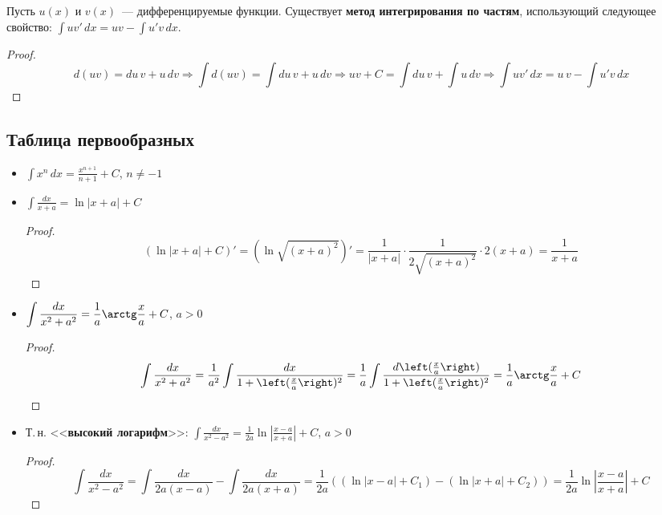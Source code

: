 Пусть $u(x)$ и $v(x)$~--- дифференцируемые функции.
 Существует \textbf{метод интегрирования по частям}, использующий следующее свойство:
$\int uv'\,dx = uv - \int u'v\,dx$.
\begin{proof}
\begin{equation*}
d(uv) = du\,v + u\,dv \Rightarrow
\int d(uv) = \int du\,v + u\,dv \Rightarrow
uv + C = \int du\,v + \int u\,dv \Rightarrow
\int uv'\,dx = u\,v - \int u'v\,dx
\end{equation*}
\end{proof}

\subsection{Таблица первообразных}
\begin{itemize}
	\item $\displaystyle \int x^n\,dx = \frac{x^{n+1}}{n + 1} + C$, $n \neq -1$
	
	\item $\displaystyle \int \frac{dx}{x + a} = \ln |x + a| + C$
	\begin{proof}
	\begin{equation*}
	(\ln |x + a| + C)' = (\ln \sqrt{(x + a)^2})' = \frac1{|x + a|} \cdot \frac1{2\sqrt{(x + a)^2}} \cdot 2(x + a) = \frac1{x + a}
	\end{equation*}
	\end{proof}
	
	\item $\displaystyle \int \frac{dx}{x^2 + a^2} = \frac1a \arctg \frac{x}a + C$, $a > 0$
	\begin{proof}
	\begin{equation*}
	\int \frac{dx}{x^2 + a^2} =
	\frac1{a^2} \int \frac{dx}{1 + \left( \frac{x}a \right)^2} =
	\frac1a \int \frac{d \left( \frac{x}a \right)}{1 + \left( \frac{x}a \right)^2} =
	\frac1a \arctg \frac{x}a + C
	\end{equation*}
	\end{proof}
	
	\item Т.\,н. <<\textbf{высокий логарифм}>>: $\displaystyle \int \frac{dx}{x^2 - a^2} = \frac1{2a} \ln \left| \frac{x - a}{x + a} \right| + C$, $a > 0$
	\begin{proof}
	\begin{equation*}
	\int \frac{dx}{x^2 - a^2} =
	\int \frac{dx}{2a(x - a)} - \int \frac{dx}{2a(x + a)} =
	\frac1{2a} ((\ln |x - a| + C_1) - (\ln |x + a| + C_2)) =
	\frac1{2a} \ln \left| \frac{x - a}{x + a} \right| + C
	\end{equation*}
	\end{proof}
	

\end{itemize}
